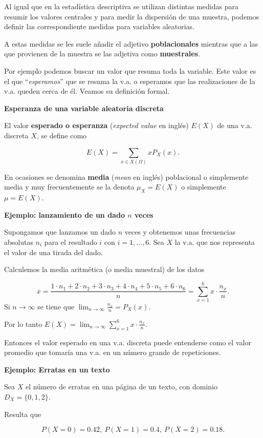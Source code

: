\documentclass[]{book}
\begin{document}
Al igual que en la estadística descriptiva se utilizan distintas medidas para
resumir los valores centrales y para medir la dispersión de una muestra, podemos definir
las correspondiente medidas para variables aleatorias.

A estas medidas se les suele añadir el adjetivo \textbf{poblacionales} mientras que a las que provienen de la muestra se las adjetiva como \textbf{muestrales}.

Por ejemplo podemos buscar un valor que resuma toda la variable. Este valor es el que ``\emph{esperamos}'' que se resuma la v.a. o esperamos que las realizaciones de la v.a. queden cerca de él. Veamos su definición formal.

\textbf{Esperanza de una variable aleatoria discreta }

El valor \textbf{esperado o esperanza} (\emph{expected value} en inglés) \(E(X)\) de una v.a. discreta \(X\), se define como

\[
E(X)=\sum_{x\in X(\Omega)} x P_{X}(x).
\]

En ocasiones se denomina \textbf{media} (\emph{mean} en inglés) poblacional o simplemente media y muy frecuentemente se la denota \(\mu_{X}=E(X)\) o simplemente \(\mu=E(X)\).

\textbf{Ejemplo: lanzamiento de un dado \(n\) veces}

Supongamos que lanzamos un dado \(n\) veces y obtenemos unas frecuencias absolutas \(n_{i}\) para el resultado \(i\) con \(i=1,\ldots,6\). Sea \(X\) la v.a. que nos representa el valor de una tirada del dado.

Calculemos la media aritmética (o media muestral) de los datos

\[
\overline{x}=\frac{1\cdot n_1+2\cdot  n_2+3\cdot  n_3+4\cdot  n_4+5\cdot  n_5+6 \cdot 
n_6}{n}=\sum_{x=1}^6 x\cdot \frac{n_{x}}{n}.
\]
Si \(n\to \infty\) se tiene que \(\displaystyle\lim_{n\to \infty} \frac{n_{x}}{n}=P_{X}(x).\)

Por lo tanto \(E(X)=\displaystyle \lim_{n\to\infty}\sum_{x=1}^6 x\cdot \frac{n_{x}}{n}.\)

Entonces el valor esperado en una v.a. discreta puede entenderse como el valor promedio que tomaría una v.a. en un número grande de repeticiones.

\textbf{Ejemplo: Erratas en un texto}

Sea \(X\) el número de erratas en una página de un texto, con dominio \(D_X=\{0,1,2\}\).

Resulta que

\[
P(X=0)=0.42,\ P(X=1)=0.4,\ P(X=2)=0.18.
\]
\end{document}
